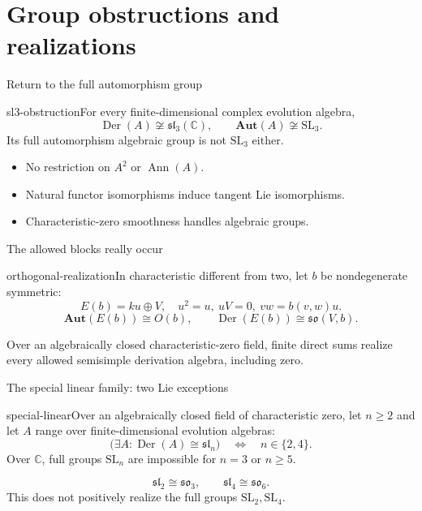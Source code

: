 \documentclass{beamer}
\begin{document}
\section[Full groups]{Group obstructions and realizations}
\begin{frame}{Return to the full automorphism group}
\begin{bookresult}{sl3-obstruction}For every finite-dimensional complex evolution algebra,\[\operatorname{Der}(A)\not\cong\mathfrak{sl}_3(\mathbb C),\qquad\mathbf{Aut}(A)\not\cong\mathrm{SL}_3.\]Its full automorphism algebraic group is not $\mathrm{SL}_3$ either.\end{bookresult}\begin{itemize}\item No restriction on $A^2$ or $\operatorname{Ann}(A)$.\item Natural functor isomorphisms induce tangent Lie isomorphisms.\item Characteristic-zero smoothness handles algebraic groups.\end{itemize}
\end{frame}
\begin{frame}{The allowed blocks really occur}
\begin{bookresult}{orthogonal-realization}In characteristic different from two, let $b$ be nondegenerate symmetric:\[E(b)=ku\oplus V,\quad u^2=u,\ uV=0,\ vw=b(v,w)u.\]\[\mathbf{Aut}(E(b))\cong O(b),\qquad\operatorname{Der}(E(b))\cong\mathfrak{so}(V,b).\]\end{bookresult}Over an algebraically closed characteristic-zero field, finite direct sums realize every allowed semisimple derivation algebra, including zero.
\end{frame}
\begin{frame}{The special linear family: two Lie exceptions}
\begin{bookresult}{special-linear}Over an algebraically closed field of characteristic zero, let $n\ge2$ and let $A$ range over finite-dimensional evolution algebras:\[\bigl(\exists A:\operatorname{Der}(A)\cong\mathfrak{sl}_n\bigr)\quad\Longleftrightarrow\quad n\in\{2,4\}.\]Over $\mathbb C$, full groups $\mathrm{SL}_n$ are impossible for $n=3$ or $n\ge5$.\end{bookresult}\[\mathfrak{sl}_2\cong\mathfrak{so}_3,\qquad\mathfrak{sl}_4\cong\mathfrak{so}_6.\]This does not positively realize the full groups $\mathrm{SL}_2,\mathrm{SL}_4$.
\end{frame}
\end{document}
